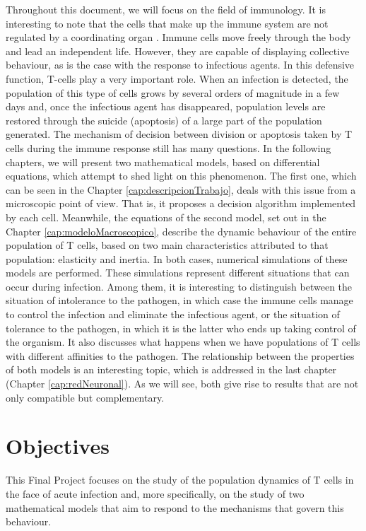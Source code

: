 Throughout this document, we will focus on the field of immunology. It is interesting to note that the cells that make up the immune system are not regulated by a coordinating organ \citep{arias2016emergent}. Immune cells move freely through the body and lead an independent life. However, they are capable of displaying collective behaviour, as is the case with the response to infectious agents. In this defensive function, T-cells play a very important role. When an infection is detected, the population of this type of cells grows by several orders of magnitude in a few days and, once the infectious agent has disappeared, population levels are restored through the suicide (apoptosis) of a large part of the population generated. The mechanism of decision between division or apoptosis taken by T cells during the immune response still has many questions. In the following chapters, we will present two mathematical models, based on differential equations, which attempt to shed light on this phenomenon. The first one, which can be seen in the Chapter \ref{cap:descripcionTrabajo}, deals with this issue from a microscopic point of view. That is, it proposes a decision algorithm implemented by each cell. Meanwhile, the equations of the second model, set out in the Chapter \ref{cap:modeloMacroscopico}, describe the dynamic behaviour of the entire population of T cells, based on two main characteristics attributed to that population: elasticity and inertia. In both cases, numerical simulations of these models are performed. These simulations represent different situations that can occur during infection. Among them, it is interesting to distinguish between the situation of intolerance to the pathogen, in which case the immune cells manage to control the infection and eliminate the infectious agent, or the situation of tolerance to the pathogen, in which it is the latter who ends up taking control of the organism. It also discusses what happens when we have populations of T cells with different affinities to the pathogen. The relationship between the properties of both models is an interesting topic, which is addressed in the last chapter (Chapter \ref{cap:redNeuronal}). As we will see, both give rise to results that are not only compatible but complementary. 



\section{Objectives}


This Final Project focuses on the study of the population dynamics of T cells in the face of acute infection and, more specifically, on the study of two mathematical models that aim to respond to the mechanisms that govern this behaviour.

